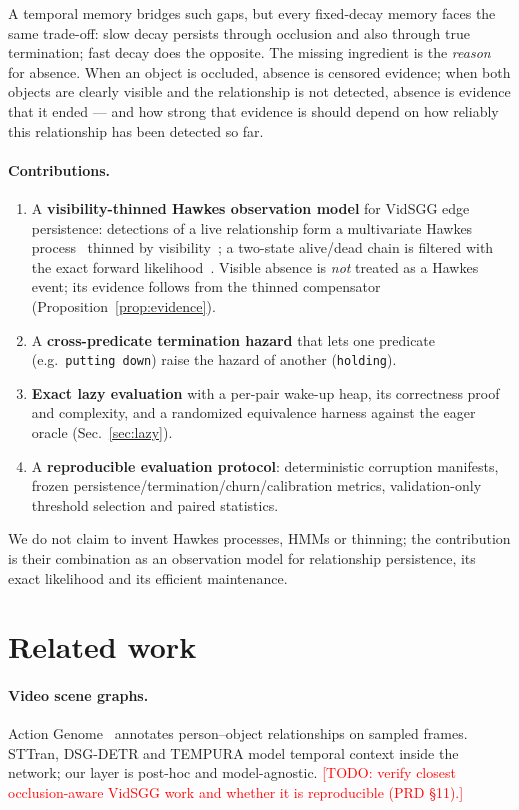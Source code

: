 \documentclass[10pt]{article}
\newcommand{\todo}[1]{\textcolor{red}{[TODO: #1]}}
\begin{document}
A temporal memory bridges such gaps, but every fixed-decay memory faces the
same trade-off: slow decay persists through occlusion and also through true
termination; fast decay does the opposite. The missing ingredient is the
\emph{reason} for absence. When an object is occluded, absence is censored
evidence; when both objects are clearly visible and the relationship is not
detected, absence is evidence that it ended --- and how strong that evidence
is should depend on how reliably this relationship has been detected so far.

\paragraph{Contributions.}
\begin{enumerate}
\item A \textbf{visibility-thinned Hawkes observation model} for VidSGG edge
persistence: detections of a live relationship form a multivariate Hawkes
process~\cite{hawkes1971spectra} thinned by visibility~\cite{lewis1979thinning};
a two-state alive/dead chain is filtered with the exact forward
likelihood~\cite{rabiner1989hmm}. Visible absence is \emph{not} treated as
a Hawkes event; its evidence follows from the thinned compensator
(Proposition~\ref{prop:evidence}).
\item A \textbf{cross-predicate termination hazard} that lets one predicate
(e.g.\ \texttt{putting down}) raise the hazard of another (\texttt{holding}).
\item \textbf{Exact lazy evaluation} with a per-pair wake-up heap, its
correctness proof and complexity, and a randomized equivalence harness
against the eager oracle (Sec.~\ref{sec:lazy}).
\item A \textbf{reproducible evaluation protocol}: deterministic corruption
manifests, frozen persistence/termination/churn/calibration metrics,
validation-only threshold selection and paired statistics.
\end{enumerate}
We do not claim to invent Hawkes processes, HMMs or thinning; the
contribution is their combination as an observation model for relationship
persistence, its exact likelihood and its efficient maintenance.

\section{Related work}
\paragraph{Video scene graphs.} Action Genome~\cite{ji2020actiongenome}
annotates person--object relationships on sampled frames. STTran, DSG-DETR
and TEMPURA model temporal context inside the network; our layer is
post-hoc and model-agnostic. \todo{verify closest occlusion-aware VidSGG
work and whether it is reproducible (PRD §11).}
\end{document}
